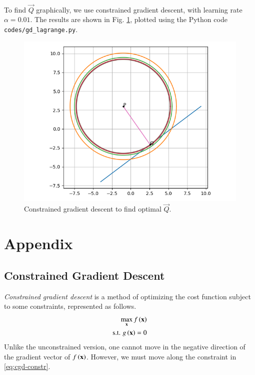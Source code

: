 \documentclass[journal,12pt,twocolumn]{IEEEtran}
\begin{document}
\begin{enumerate}
\begin{align}
        \label{eq:sol}
    \end{align}
    To find $\vec{Q}$ graphically, we use constrained gradient descent, with
    learning rate $\alpha = 0.01$. The results are shown in Fig.
    \ref{fig:gd-lag}, plotted using the Python code
    \texttt{codes/gd\_lagrange.py}.
    \begin{figure}[!ht]
        \centering
        \includegraphics[width=\columnwidth]{figs/gd_lagrange.png}
        \caption{Constrained gradient descent to find optimal $\vec{Q}$.}
        \label{fig:gd-lag}
    \end{figure}
\end{enumerate}

\section{Appendix}
\subsection{Constrained Gradient Descent}

\textit{Constrained gradient descent} is a method of optimizing the cost function
subject to some constraints, represented as follows.
\begin{align}
    \max_{\mathbf{x}}f\left(\mathbf{x}\right) \label{eq:cgd-cost} \\
    \textrm{s.t. } g\left(\mathbf{x}\right) = 0
    \label{eq:cgd-constr}
\end{align}
Unlike the unconstrained version, one cannot move in the negative direction of the
gradient vector of $f\left(\mathbf{x}\right)$. However, we must move along the constraint in
\eqref{eq:cgd-constr}.
\end{document}
